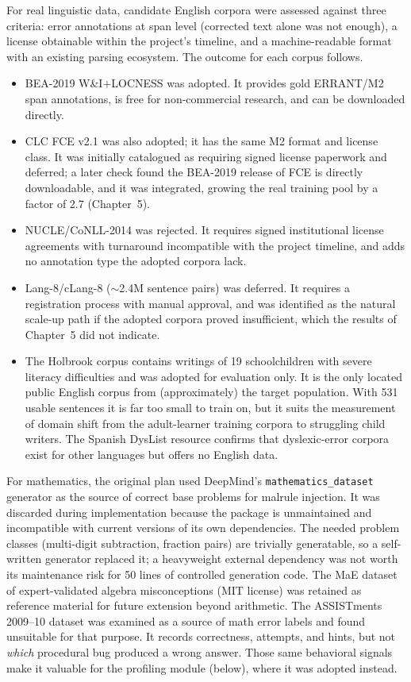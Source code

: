 For real linguistic data, candidate English corpora were assessed against three criteria: error annotations at span level (corrected text alone was not enough), a license obtainable within the project's timeline, and a machine-readable format with an existing parsing ecosystem. The outcome for each corpus follows.
\begin{itemize}
    \item BEA-2019 W\&I+LOCNESS \parencite{Bryant2019} was adopted. It provides gold ERRANT/M2 span annotations, is free for non-commercial research, and can be downloaded directly.
    \item CLC FCE v2.1 \parencite{YannakoudakisBriscoeMedlock2011} was also adopted; it has the same M2 format and license class. It was initially catalogued as requiring signed license paperwork and deferred; a later check found the BEA-2019 release of FCE is directly downloadable, and it was integrated, growing the real training pool by a factor of 2.7 (Chapter~5).
    \item NUCLE/CoNLL-2014 was rejected. It requires signed institutional license agreements with turnaround incompatible with the project timeline, and adds no annotation type the adopted corpora lack.
    \item Lang-8/cLang-8 ($\sim$2.4M sentence pairs) was deferred. It requires a registration process with manual approval, and was identified as the natural scale-up path if the adopted corpora proved insufficient, which the results of Chapter~5 did not indicate.
    \item The Holbrook corpus \parencite{Holbrook1964,Mitton1985} contains writings of 19 schoolchildren with severe literacy difficulties and was adopted for evaluation only. It is the only located public English corpus from (approximately) the target population. With 531 usable sentences it is far too small to train on, but it suits the measurement of domain shift from the adult-learner training corpora to struggling child writers. The Spanish DysList resource \parencite{RelloBaezaYates2014} confirms that dyslexic-error corpora exist for other languages but offers no English data.
\end{itemize}

For mathematics, the original plan used DeepMind's \texttt{mathematics\_dataset} generator as the source of correct base problems for malrule injection. It was discarded during implementation because the package is unmaintained and incompatible with current versions of its own dependencies. The needed problem classes (multi-digit subtraction, fraction pairs) are trivially generatable, so a self-written generator replaced it; a heavyweight external dependency was not worth its maintenance risk for 50 lines of controlled generation code. The MaE dataset of expert-validated algebra misconceptions (MIT license) was retained as reference material for future extension beyond arithmetic. The ASSISTments 2009--10 dataset \parencite{Feng2009Assistments} was examined as a source of math error labels and found unsuitable for that purpose. It records correctness, attempts, and hints, but not \emph{which} procedural bug produced a wrong answer. Those same behavioral signals make it valuable for the profiling module (below), where it was adopted instead.

